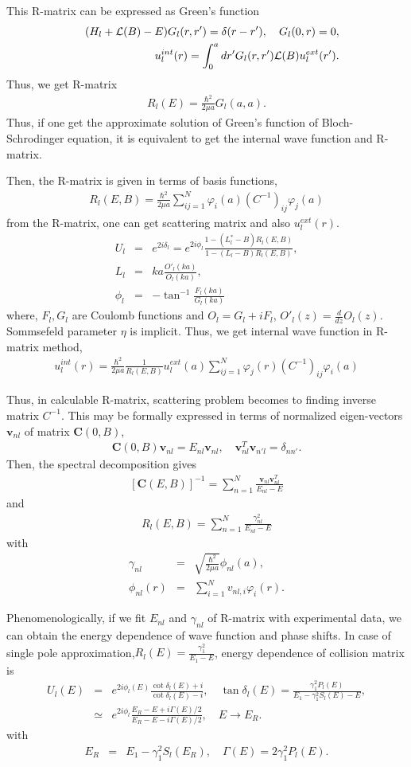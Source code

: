 \documentclass[11pt]{book}
\def\bm{\boldsymbol}
\newcommand{\bea}{\begin{eqnarray}}
\newcommand{\eea}{\end{eqnarray}}
\newcommand{\no}{\nonumber \\}
\begin{document}
This R-matrix can be expressed as Green's function 
\bea 
& &(H_l+{\cal L}(B)-E) G_l(r,r')=\delta(r-r'),\quad G_l(0,r)=0,\no 
& & u_l^{int}(r)=\int_0^a dr' G_l(r,r'){\cal L}(B) u_l^{ext}(r').
\eea 
Thus, we get R-matrix 
\bea 
R_l(E)=\frac{\hbar^2}{2\mu a}G_{l}(a,a).
\eea 
Thus, if one get the approximate solution of Green's function
of Bloch-Schrodinger equation, it is equivalent to get the internal wave function
and R-matrix. 

Then, the R-matrix is given in terms of basis functions, 
\bea 
\label{eq:RmatrixfromC}
R_l(E,B)=\frac{\hbar^2}{2\mu a}\sum_{ij=1}^{N} \varphi_i(a) (C^{-1})_{ij} \varphi_j(a)
\eea 
from the R-matrix, one can get scattering matrix and also $u^{ext}_l(r)$.
\bea 
\label{eq:RmatrixPhaseshift:singlechannel}
U_l&=&e^{2i\delta_l} = e^{2i\phi_l}\frac{1-(L_l^*-B)R_l(E,B)}{1-(L_l-B)R_l(E,B)},\no 
L_l&=& k a \frac {O'_l(ka)}{O_l(ka)},\no 
\phi_l&=&-\tan^{-1} \frac{F_l(ka)}{G_l(ka)}
\eea 
where, $F_l,G_l$ are Coulomb functions and $O_l=G_l+i F_l $, $O'_l(z)=\frac{d}{dz}O_l(z)$. Sommsefeld parameter $\eta$ is implicit. 
Thus, we get internal wave function in R-matrix method,
\bea 
\label{eq:RmatrixInternalWavefuction}
u_l^{int}(r)=\frac{\hbar^2}{2\mu a}\frac{1}{ R_l (E,B)} u_l^{ext}(a) \sum_{i j=1}^N \varphi_j(r) (C^{-1})_{ij} \varphi_i (a) 
\eea 

Thus, in calculable R-matrix, scattering problem becomes to finding inverse matrix $C^{-1}$. 
This may be formally expressed  in terms of normalized eigen-vectors ${\bm v}_{nl}$ of matrix ${\bm C}(0,B)$,
\bea 
\label{eq:RmatrixCEigenEq}
{\bm C}(0,B){\bm v}_{nl}=E_{nl}{\bm v}_{nl},\quad {\bm v}_{nl}^T{\bm v}_{n'l}=\delta_{nn'}.
\eea 
Then, the spectral decomposition gives
\bea 
\left[{\bm C}(E,B)\right]^{-1}=\sum_{n=1}^N \frac{ {\bm v}_{nl}{\bm v}_{nl}^T}{E_{nl}-E}
\eea 
and 
\bea 
\label{eq:Rmatrixform:singlechannel}
R_{l}(E,B)=\sum_{n=1}^N \frac{\gamma_{nl}^2}{E_{nl}-E}
\eea 
with
\bea 
\gamma_{nl}&=&\sqrt{\frac{\hbar^2}{2\mu a}} \phi_{nl}(a),\no 
\phi_{nl}(r)&=& \sum_{i=1}^N v_{nl,i}\varphi_i(r).
\eea 

Phenomenologically, if we fit $E_{nl}$ and $\gamma_{nl}$ of R-matrix with experimental data,
we can obtain the energy dependence of wave function and phase shifts.  
In case of single pole approximation,$R_l(E)=\frac{\gamma_1^2}{E_1-E}$,
energy dependence of collision matrix is 
\bea 
U_l(E) &=& e^{2i\phi_l(E)}\frac{\cot\delta_l(E) +i}{\cot\delta_l(E)-i},
\quad \tan\delta_l(E)=\frac{\gamma_1^2 P_l(E)}{E_1-\gamma_1^2 S_l(E)-E} ,\no 
   &\simeq& e^{2i\phi_l}\frac{E_R-E+i\Gamma(E)/2}{E_R-E-i\Gamma(E)/2},\quad E\to E_R.
\eea 
with 
\bea 
   E_R &=& E_1-\gamma_1^2 S_l(E_R),\quad  \Gamma(E)=2\gamma_1^2 P_l(E). 
\eea 
\end{document}
